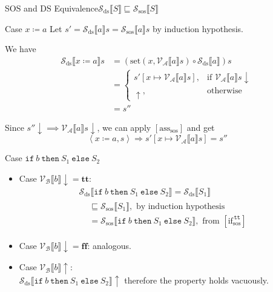 \documentclass{beamer}
\newcommand{\ifelse}[3]{\mathtt{if}\ #1\ \mathtt{then}\ #2\ \mathtt{else}\ #3}
\newcommand{\sem}[2]{\mathcal{#1} \llbracket #2 \rrbracket}
\newcommand{\tr}{\mathbf{tt}}
\newcommand{\ff}{\mathbf{ff}}
\newcommand{\undefined}{\uparrow}
\newcommand{\defined}{\!\downarrow}
\begin{document}
\begin{frame}{SOS and DS Equivalence}{$\sem{S_\mathrm{ds}}{S} \sqsubseteq \sem{S_\mathrm{sos}}{S}$}

    \begin{overprint}
        \begin{block}{Case $x \coloneq a$}
            Let $s' = \sem{S_\mathrm{ds}}{a}s = \sem{S_\mathrm{sos}}{a}s$ by induction hypothesis.

            We have
            \begin{align*}
                \sem{S_{\mathrm{ds}}}{x \coloneq a}s & =
                (\mathrm{set}(x, \sem{V_A}{a}s) \circ \sem{S_\mathrm{ds}}{a})s   \\
                                                     & =
                \begin{cases}
                    s'[x \mapsto \sem{V_A}{a}s], & \mbox{if } \sem{V_A}{a}s \defined \\
                    \undefined,                  & \mbox{otherwise}
                \end{cases} \\
                                                     & = s''
            \end{align*}

            Since $s''\defined \implies \sem{V_A}{a}s \defined$, we can apply $[\mbox{ass}_{\mathrm{sos}}]$ and get
            $$\left< x \coloneq a, s \right> \Rightarrow s'[x \mapsto \sem{V_A}{a}s] = s''$$
        \end{block}

        \begin{block}{Case $\ifelse{b}{S_1}{S_2}$}
            \begin{itemize}
                \item Case $\sem{V_B}{b}\defined = \tr$:
                      \begin{multline*}
                          \sem{S_\mathrm{ds}}{\ifelse{b}{S_1}{S_2}} = \sem{S_\mathrm{ds}}{S_1}\\
                          \begin{aligned}
                               & \sqsubseteq \sem{S_\mathrm{sos}}{S_1}, \mbox{ by induction hypothesis}                                 \\
                               & = \sem{S_\mathrm{sos}}{\ifelse{b}{S_1}{S_2}}, \mbox{ from } [\mbox{if}^{\mathtt{\,tt}}_{\mathrm{sos}}]
                          \end{aligned}
                      \end{multline*}
                \item Case $\sem{V_B}{b}\defined = \ff$: analogous.
                      \medskip
                \item Case $\sem{V_B}{b}\!\undefined$: \\
                      $\sem{S_\mathrm{ds}}{\ifelse{b}{S_1}{S_2}}\!\undefined$ therefore the property holds vacuously.
            \end{itemize}
        \end{block}


\end{overprint}
\end{frame}
\end{document}
